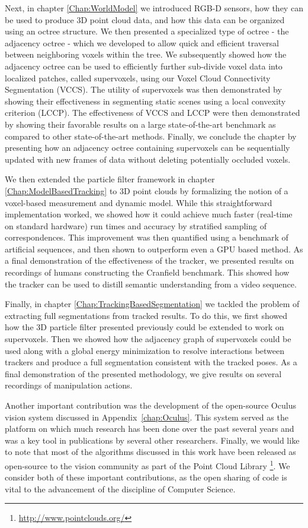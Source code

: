Next, in chapter \ref{Chap:WorldModel} we introduced RGB-D sensors, how they can be used to produce 3D point cloud data, and how this data can be organized using an octree structure. We then presented a specialized type of octree - the adjacency octree - which we developed to allow quick and efficient traversal between neighboring voxels within the tree. We subsequently showed how the adjacency octree can be used to efficiently further sub-divide voxel data into localized patches, called supervoxels, using our Voxel Cloud Connectivity Segmentation (VCCS). The utility of supervoxels was then demonstrated by showing their effectiveness in segmenting static scenes using a local convexity criterion (LCCP). The effectiveness of VCCS and LCCP were then demonstrated by showing their favorable results on a large state-of-the-art benchmark as compared to other state-of-the-art methods. Finally, we conclude the chapter by presenting how an adjacency octree containing supervoxels can be sequentially updated with new frames of data without deleting potentially occluded voxels.

We then extended the particle filter framework in chapter \ref{Chap:ModelBasedTracking} to 3D point clouds by formalizing the notion of a voxel-based measurement and dynamic model. While this straightforward implementation worked, we showed how it could achieve much faster (real-time on standard hardware) run times and accuracy by stratified sampling of correspondences. This improvement was then quantified using a benchmark of artificial sequences, and then shown to outperform even a GPU based method. As a final demonstration of the effectiveness of the tracker, we presented results on recordings of humans constructing the Cranfield benchmark. This showed how the tracker can be used to distill semantic understanding from a video sequence. 

Finally, in chapter \ref{Chap:TrackingBasedSegmentation} we tackled the problem of extracting full segmentations from tracked results. To do this, we first showed how the 3D particle filter presented previously could be extended to work on supervoxels. Then we showed how the adjacency graph of supervoxels could be used along with a global energy minimization to resolve interactions between trackers and produce a full segmentation consistent with the tracked poses. As a final demonstration of the presented methodology, we give results on several recordings of manipulation actions. 

Another important contribution was the development of the open-source Oculus vision system discussed in Appendix~\ref{chap:Oculus}. This system served as the platform on which much research has been done over the past several years and was a key tool in publications by several other researchers. Finally, we would like to note that most of the algorithms discussed in this work have been released as open-source to the vision community as part of the Point Cloud Library \footnote{\url{http://www.pointclouds.org/}}. We consider both of these important contributions, as the open sharing of code is vital to the advancement of the discipline of Computer Science.

